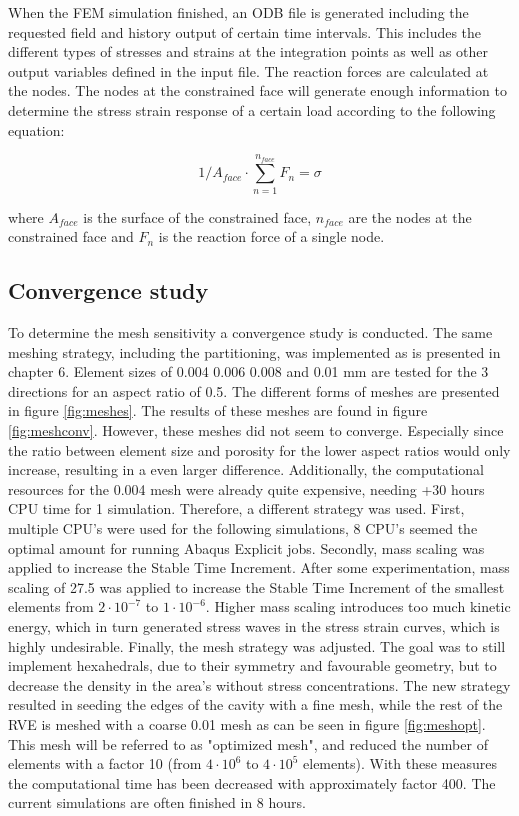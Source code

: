 When the FEM simulation finished, an ODB file is generated including the requested field and history output of certain time intervals. This includes the different types of stresses and strains at the integration points as well as other output variables defined in the input file. The reaction forces are calculated at the nodes. The nodes at the constrained face will generate enough information to determine the stress strain response of a certain load according to the following equation: 

\begin{equation} \label{eqn:RVESS}
1/A_{face}\cdot\sum_{n=1}^ {n_{face}} F_n= \sigma
\end{equation}

\noindent where $A_{face}$ is the surface of the constrained face, $n_{face}$ are the nodes at the constrained face and $F_n$ is the reaction force of a single node.

\subsection{Convergence study}
To determine the mesh sensitivity a convergence study is conducted. The same meshing strategy, including the partitioning, was implemented as is presented in chapter 6. Element sizes of 0.004 0.006 0.008 and 0.01 mm are tested for the 3 directions for an aspect ratio of 0.5. The different forms of meshes are presented in figure \ref{fig:meshes}. The results of these meshes are found in figure \ref{fig:meshconv}. However, these meshes did not seem to converge. Especially since the ratio between element size and porosity for the lower aspect ratios would only increase, resulting in a even larger difference.  Additionally, the computational resources for the 0.004 mesh were already quite expensive, needing +30 hours CPU time for 1 simulation. Therefore, a different strategy was used. First, multiple CPU's were used for the following simulations, 8 CPU's seemed the optimal amount for running Abaqus Explicit jobs. 
Secondly, mass scaling was applied to increase the Stable Time Increment. After some experimentation, mass scaling of 27.5 was applied to increase the Stable Time Increment of the smallest elements from $2\cdot10^{-7}$ to $1\cdot10^{-6}$. Higher mass scaling introduces too much kinetic energy, which in turn generated stress waves in the stress strain curves, which is highly undesirable. Finally, the mesh strategy was adjusted. The goal was to still implement hexahedrals, due to their symmetry and favourable geometry, but to decrease the density in the area's without stress concentrations. The new strategy resulted in seeding the edges of the cavity with a fine mesh, while the rest of the RVE is meshed with a coarse 0.01 mesh as can be seen in figure \ref{fig:meshopt}. This mesh will be referred to as "optimized mesh", and reduced the number of elements with a factor 10 (from $4\cdot 10^6$ to $4 \cdot 10^5$ elements). With these measures the computational time has been decreased with approximately factor  400. The current simulations are often finished in 8 hours. 

